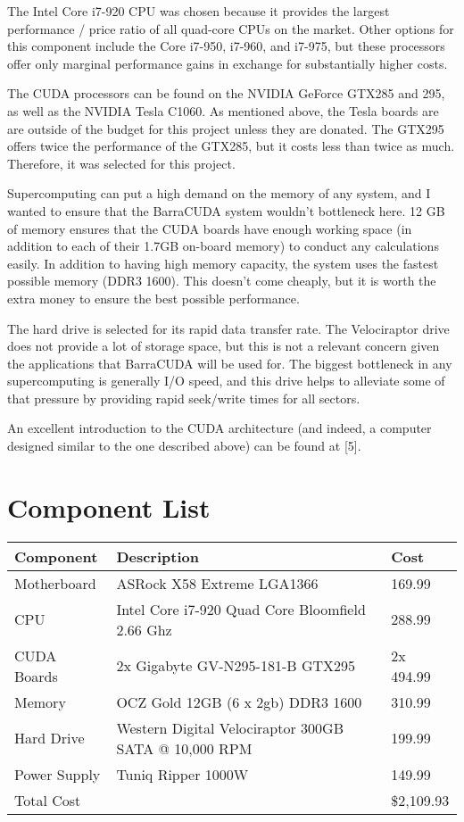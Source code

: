 \documentclass{article}      %
\begin{document}
The Intel Core i7-920 CPU was chosen because it provides the largest performance / price ratio of all quad-core CPUs on the market. Other options for this component include the Core i7-950, i7-960, and i7-975, but these  processors offer only marginal performance gains in exchange for substantially higher costs.

The CUDA processors can be found on the NVIDIA GeForce GTX285 and 295, as well as the NVIDIA Tesla C1060. As mentioned above, the Tesla boards are are outside of the budget for this project unless they are donated. The GTX295 offers twice the performance of the GTX285, but it costs less than twice as much. Therefore, it was selected for this project.

Supercomputing can put a high demand on the memory of any system, and I wanted to ensure that the BarraCUDA system wouldn't bottleneck here. 12 GB of memory ensures that the CUDA boards have enough working space (in addition to each of their 1.7GB on-board memory) to conduct any calculations easily. In addition to having high memory capacity, the system uses the fastest possible memory (DDR3 1600). This doesn't come cheaply, but it is worth the extra money to ensure the best possible performance.

The hard drive is selected for its rapid data transfer rate. The Velociraptor drive does not provide a lot of storage space, but this is not a relevant concern given the applications that BarraCUDA will be used for. The biggest bottleneck in any supercomputing is generally I/O speed, and this drive helps to alleviate some of that pressure by providing rapid seek/write times for all sectors.

An excellent introduction to the CUDA architecture (and indeed, a computer designed similar to the one described above) can be found at [5].


\section{Component List}
\begin{table}[h]
	\centering
		\begin{tabular}{|l|l|l|}
		\hline
			Component & Description & Cost\\ \hline
			Motherboard & ASRock X58 Extreme LGA1366 & 169.99\\ \hline
			CPU & Intel Core i7-920 Quad Core Bloomfield 2.66 Ghz & 288.99\\ \hline
			CUDA Boards & 2x Gigabyte GV-N295-181-B  GTX295 & 2x 494.99\\ \hline
			Memory & OCZ Gold 12GB (6 x 2gb) DDR3 1600 & 310.99\\ \hline
			Hard Drive & Western Digital Velociraptor 300GB SATA @ 10,000 RPM & 199.99\\ \hline
			Power Supply & Tuniq Ripper 1000W & 149.99\\ \hline
			Total Cost &  & \$2,109.93\\ 
		\hline
		\end{tabular}
\end{table}
\end{document}

